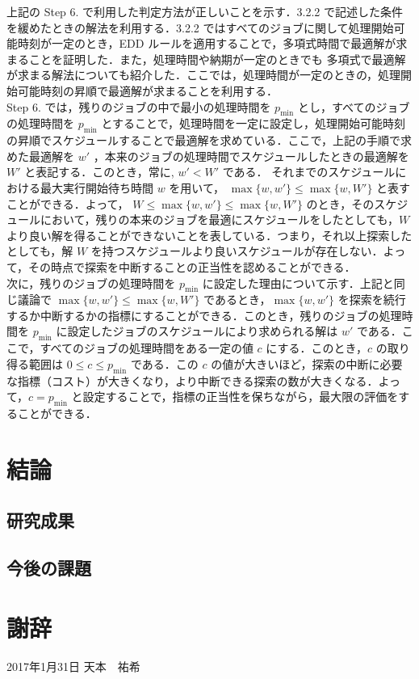 \documentclass[12pt]{optlab-bachelor}
\def\氏名{天本　祐希}
\begin{document}
  上記の Step 6. で利用した判定方法が正しいことを示す．3.2.2 で記述した条件を緩めたときの解法を利用する．3.2.2 ではすべてのジョブに関して処理開始可能時刻が一定のとき，EDD ルールを適用することで，多項式時間で最適解が求まることを証明した．また，処理時間や納期が一定のときでも
  多項式で最適解が求まる解法についても紹介した．ここでは，処理時間が一定のときの，処理開始可能時刻の昇順で最適解が求まることを利用する．\\
  Step 6. では，残りのジョブの中で最小の処理時間を $p_{\min}$ とし，すべてのジョブの処理時間を $p_{\min}$ とすることで，処理時間を一定に設定し，処理開始可能時刻の昇順でスケジュールすることで最適解を求めている．ここで，上記の手順で求めた最適解を $w'$ ，本来のジョブの処理時間でスケジュールしたときの最適解を $W'$ と表記する．このとき，常に, $w' < W'$ である．
  それまでのスケジュールにおける最大実行開始待ち時間 $w$ を用いて，
  $\max \{ w, w'\} \le \max \{ w, W'\}$ と表すことができる．よって，
  $W \le \max　\{ w,w'\} \le \max \{ w,W'\}$ のとき，そのスケジュールにおいて，残りの本来のジョブを最適にスケジュールをしたとしても，$W$ より良い解を得ることができないことを表している．つまり，それ以上探索したとしても，解 $W$ を持つスケジュールより良いスケジュールが存在しない．よって，その時点で探索を中断することの正当性を認めることができる．\\
  次に，残りのジョブの処理時間を $p_{\min}$ に設定した理由について示す．上記と同じ議論で $\max\{w, w'\} \le \max\{w, W'\}$ であるとき，$\max\{w,w'\}$ を探索を続行するか中断するかの指標にすることができる．このとき，残りのジョブの処理時間を $p_{\min}$ に設定したジョブのスケジュールにより求められる解は $w'$ である．ここで，すべてのジョブの処理時間をある一定の値 $c$ にする．このとき，$c$ の取り得る範囲は $0 \le c \le p_{\min}$ である．この $c$ の値が大きいほど，探索の中断に必要な指標（コスト）が大きくなり，より中断できる探索の数が大きくなる．よって，$c = p_{\min}$ と設定することで，指標の正当性を保ちながら，最大限の評価をすることができる．

  \chapter{結論}
  \section{研究成果}
  \section{今後の課題}

  
  

  \chapter*{謝辞}

  \begin{flushright}
    2017年1月31日 \氏名
  \end{flushright}
  \endmatter
  
\end{document}
